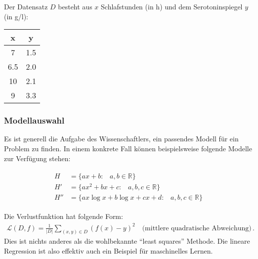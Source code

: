 Der Datensatz $D$ besteht aus $x$ Schlafstunden (in h) und dem Serotoninspiegel $y$ (in \textmu g/l):

\begin{table}[h]
\centering
\begin{tabular}{c|c}
x   & y   \\ \hline
7   & 1.5 \\
6.5 & 2.0 \\
10  & 2.1 \\
9   & 3.3 
\end{tabular}
\label{tab:vl11-3}
\end{table}


\subsubsection{Modellauswahl}
\label{subsec:vl11-10}

Es ist generell die Aufgabe des Wissenschaftlers, ein passendes Modell f\"ur ein Problem zu finden. In einem konkrete Fall k\"onnen beispielsweise folgende Modelle zur Verf\"ugung stehen:

\begin{align}
    \begin{split}
        H &= \{ ax + b\text{:}\quad a, b \in \mathbb{R} \}\\
        H'&= \{ ax^2 + bx + c\text{:}\quad a, b, c \in \mathbb{R} \}\\
        H''&= \{ ax \log x + b \log x + cx + d\text{:}\quad a, b, c \in \mathbb{R} \}
        \label{eq:vl11-4}
    \end{split}
\end{align}

Die Verlustfunktion hat folgende Form:
\begin{align}
\mathcal{L}(D,f) = \frac{1}{|D|} \sum_{(x,y) \in D} (f(x) - y)^2 \quad \text{(mittlere quadratische Abweichung)}\,.
\label{eq:vl11-5}
\end{align}
Dies ist nichts anderes als die wohlbekannte ``least squares'' Methode. Die lineare Regression ist also effektiv auch ein Beispiel f\"ur maschinelles Lernen.
